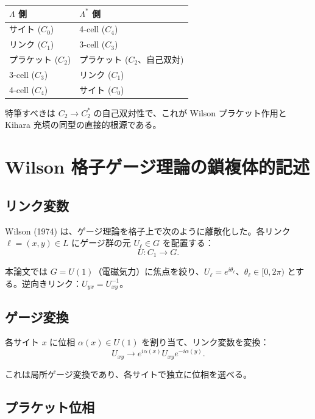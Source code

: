 \documentclass[a4paper,11pt]{ltjsarticle}
\begin{document}
\begin{center}
\begin{tabular}{ll}
\toprule
$\Lambda$ 側 & $\Lambda^*$ 側 \\
\midrule
サイト ($C_0$) & 4-cell ($C_4$) \\
リンク ($C_1$) & 3-cell ($C_3$) \\
プラケット ($C_2$) & プラケット ($C_2$、自己双対) \\
3-cell ($C_3$) & リンク ($C_1$) \\
4-cell ($C_4$) & サイト ($C_0$) \\
\bottomrule
\end{tabular}
\end{center}

特筆すべきは $C_2 \to C_2^*$ の自己双対性で、これが Wilson プラケット作用と Kihara 充填の同型の直接的根源である。

\section{Wilson 格子ゲージ理論の鎖複体的記述}

\subsection{リンク変数}

Wilson (1974) は、ゲージ理論を格子上で次のように離散化した。各リンク $\ell = (x, y) \in L$ にゲージ群の元 $U_\ell \in G$ を配置する：
\[ U : C_1 \to G. \]

本論文では $G = U(1)$（電磁気力）に焦点を絞り、$U_\ell = e^{i\theta_\ell}$、$\theta_\ell \in [0, 2\pi)$ とする。逆向きリンク：$U_{yx} = U_{xy}^{-1}$。

\subsection{ゲージ変換}

各サイト $x$ に位相 $\alpha(x) \in U(1)$ を割り当て、リンク変数を変換：
\begin{equation}
U_{xy} \to e^{i\alpha(x)} U_{xy} e^{-i\alpha(y)}. \tag{4.1}
\end{equation}

これは局所ゲージ変換であり、各サイトで独立に位相を選べる。

\subsection{プラケット位相}
\end{document}
